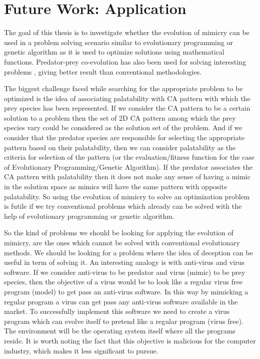 \documentclass[letterpaper]{article}
\numberwithin{equation}{section}
\begin{document}
\section{Future Work: Application}
\label{section:application}

The goal of this thesis is to investigate whether the evolution of mimicry can be used in a problem solving scenario similar to evolutionary programming or genetic algorithm as it is used to optimize solutions using mathematical functions. Predator-prey co-evolution has also been used for solving interesting problems \cite{hillis1990}, giving better result than conventional methodologies. 

The biggest challenge faced while searching for the appropriate problem to be optimized is the idea of associating palatability with CA pattern with which the prey species has been represented. If we consider the CA pattern to be a certain solution to a problem then the set of 2D CA pattern among which the prey species vary could be considered as the solution set of the problem. And if we consider that the predator species are responsible for selecting the appropriate pattern based on their palatability, then we can consider palatability as the criteria for selection of the pattern (or the evaluation/fitness function for the case of Evolutionary Programming/Genetic Algorithm). If the predator associates the CA pattern with palatability then it does not make any sense of having a mimic in the solution space as mimics will have the same pattern with opposite palatability. So using the evolution of mimicry to solve an optimization problem is futile if we try conventional problems which already can be solved with the help of evolutionary programming or genetic algorithm. 

So the kind of problems we should be looking for applying the evolution of mimicry, are the ones which cannot be solved with conventional evolutionary methods. We should be looking for a problem where the idea of deception can be useful in term of solving it. An interesting analogy is with anti-virus and virus software. If we consider anti-virus to be predator and virus (mimic) to be prey species, then the objective of a virus would be to look like a regular virus free program (model) to get pass an anti-virus software. In this way by mimicking a regular program a virus can get pass any anti-virus software available in the market. To successfully implement this software we need to create a virus program which can evolve itself to pretend like a regular program (virus free). The environment will be the operating system itself where all the programs reside. It is worth noting the fact that this objective is malicious for the computer industry, which makes it less significant to pursue. 
\end{document}
